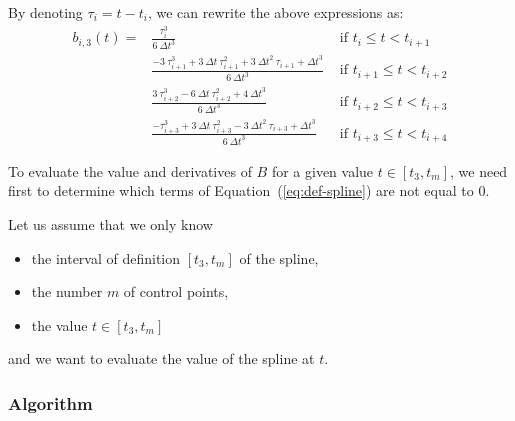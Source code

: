\documentclass{article}
\begin{document}
By denoting $\tau_i=t-t_i$, we can rewrite the above expressions as:
      \begin{eqnarray*}
      b_{i,3}(t)=& \frac{\tau_i^3}{6\ \Delta t^3} & \mbox{ if } t_{i} \leq t < t_{i+1} \\
      & \frac{-3\ \tau_{i+1}^3 + 3\ \Delta t\ \tau_{i+1}^2 + 3\ \Delta t^2\ \tau_{i+1}+\Delta t^3}{6\ \Delta t^3}& \mbox{ if } t_{i+1} \leq t < t_{i+2} \\  
      & \frac{3\ \tau_{i+2}^3-6\ \Delta t\ \tau_{i+2}^2 + 4\ \Delta t^3}{6\ \Delta t^3}& \mbox{ if } t_{i+2} \leq t < t_{i+3} \\  
      & \frac{-\tau_{i+3}^3 + 3\ \Delta t\ \tau_{i+3}^2 - 3\ \Delta t^2\ \tau_{i+3} + \Delta t^3 }{6\ \Delta t^3}& \mbox{ if } t_{i+3} \leq t < t_{i+4} 
      \end{eqnarray*}

To evaluate the value and derivatives of $B$ for a given value $t\in [t_3,t_m]$, we need first to determine which terms of Equation~(\ref{eq:def-spline}) are not equal to 0.

Let us assume that we only know
\begin{itemize}
  \item the interval of definition $[t_3,t_m]$ of the spline,
  \item the number $m$ of control points,
  \item the value $t\in[t_3,t_m]$
\end{itemize}
and we want to evaluate the value of the spline at $t$.

\subsubsection*{Algorithm}
\end{document}
